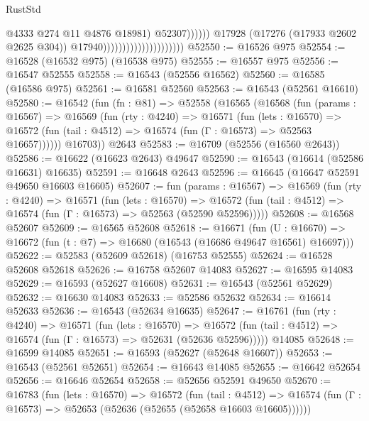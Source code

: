 \begin{lexlean}{RustStd}
\begin{coremodule}
                                                            @4333
                                                            @274
                                                            @11
                                                            @4876
                                                            @18981)
                                                          @52307))))))
                                              @17928
                                              (@17276 (@17933 @2602 @2625 @304))
                                              @17940)))))))))))))))))))))
@52550 := @16526 @975
@52554 := @16528 (@16532 @975) (@16538 @975)
@52555 := @16557 @975
@52556 := @16547 @52555
@52558 := @16543 (@52556 @16562)
@52560 := @16585 (@16586 @975)
@52561 := @16581 @52560
@52563 := @16543 (@52561 @16610)
@52580 := @16542
    (fun (fn : @81) =>
    @52558
      (@16565
        (@16568
          (fun (params : @16567) =>
          @16569
            (fun (rty : @4240) =>
            @16571
              (fun (lets : @16570) =>
              @16572 (fun (tail : @4512) => @16574 (fun (Γ : @16573) => @52563 @16657))))))
        @16703))
    @2643
@52583 := @16709 (@52556 (@16560 @2643))
@52586 := @16622 (@16623 @2643) @49647
@52590 := @16543 (@16614 (@52586 @16631) @16635)
@52591 := @16648 @2643
@52596 := @16645 (@16647 @52591 @49650 @16603 @16605)
@52607 := fun (params : @16567) =>
  @16569
    (fun (rty : @4240) =>
    @16571
      (fun (lets : @16570) =>
      @16572 (fun (tail : @4512) => @16574 (fun (Γ : @16573) => @52563 (@52590 @52596)))))
@52608 := @16568 @52607
@52609 := @16565 @52608
@52618 := @16671
    (fun (U : @16670) => @16672 (fun (t : @7) => @16680 (@16543 (@16686 @49647 @16561) @16697)))
@52622 := @52583 (@52609 @52618) (@16753 @52555)
@52624 := @16528 @52608 @52618
@52626 := @16758 @52607 @14083
@52627 := @16595 @14083
@52629 := @16593 (@52627 @16608)
@52631 := @16543 (@52561 @52629)
@52632 := @16630 @14083
@52633 := @52586 @52632
@52634 := @16614 @52633
@52636 := @16543 (@52634 @16635)
@52647 := @16761
    (fun (rty : @4240) =>
    @16571
      (fun (lets : @16570) =>
      @16572 (fun (tail : @4512) => @16574 (fun (Γ : @16573) => @52631 (@52636 @52596)))))
    @14085
@52648 := @16599 @14085
@52651 := @16593 (@52627 (@52648 @16607))
@52653 := @16543 (@52561 @52651)
@52654 := @16643 @14085
@52655 := @16642 @52654
@52656 := @16646 @52654
@52658 := @52656 @52591 @49650
@52670 := @16783
    (fun (lets : @16570) =>
    @16572
      (fun (tail : @4512) =>
      @16574 (fun (Γ : @16573) => @52653 (@52636 (@52655 (@52658 @16603 @16605))))))

\end{coremodule}
\end{lexlean}

